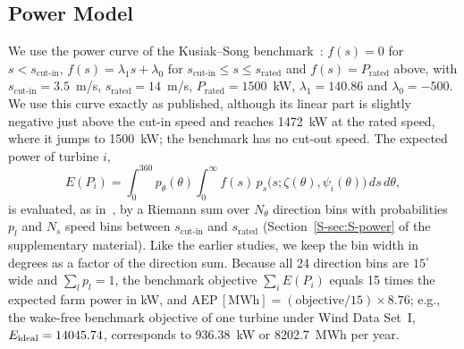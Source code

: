\documentclass[journal,twoside]{IEEEtran}
\begin{document}
\subsection{Power Model}
\label{sec:powermodel}
We use the power curve of the Kusiak--Song benchmark~\cite{Kusiak2010}: $f(s)=0$ for $s<s_{\text{cut-in}}$, $f(s)=\lambda_1 s+\lambda_0$ for $s_{\text{cut-in}}\le s\le s_{\text{rated}}$ and $f(s)=P_{\text{rated}}$ above, with $s_{\text{cut-in}}=3.5$~m/s, $s_{\text{rated}}=14$~m/s, $P_{\text{rated}}=1500$~kW, $\lambda_1=140.86$ and $\lambda_0=-500$. We use this curve exactly as published, although its linear part is slightly negative just above the cut-in speed and reaches 1472~kW at the rated speed, where it jumps to 1500~kW; the benchmark has no cut-out speed. The expected power of turbine $i$,
\begin{equation}\label{eq8}
E(P_i) = \int_0^{360} p_\theta(\theta) \int_0^{\infty} f(s)\,
       p_s\bigl(s; \zeta(\theta), \psi_i(\theta)\bigr) \, ds \, d\theta ,
\end{equation}
is evaluated, as in~\cite{Kusiak2010}, by a Riemann sum over $N_\theta$ direction bins with probabilities $p_l$ and $N_s$ speed bins between $s_{\text{cut-in}}$ and $s_{\text{rated}}$ (Section~\ref{S-sec:S-power} of the supplementary material). Like the earlier studies, we keep the bin width in degrees as a factor of the direction sum. Because all 24 direction bins are $15^\circ$ wide and $\sum_l p_l=1$, the benchmark objective $\sum_i E(P_i)$ equals 15 times the expected farm power in kW, and $\mathrm{AEP}\,[\mathrm{MWh}] = (\text{objective}/15)\times 8.76$; e.g., the wake-free benchmark objective of one turbine under Wind Data Set~I, $E_{\rm ideal}=14045.74$, corresponds to 936.38~kW or 8202.7~MWh per year.
\end{document}
